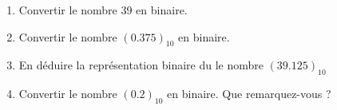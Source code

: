 \documentclass[a4paper,11pt]{article}
\begin{document}
\begin{enumerate}
\item Convertir le nombre 39 en binaire.



\item Convertir le nombre $(0.375 )_{10}$ en binaire.

\item En déduire la représentation binaire du le nombre $( 39.125 )_{10}$


\item Convertir le nombre $( 0.2)_{10}$ en binaire. Que remarquez-vous ?
%
%


\end{enumerate}
\end{document}
